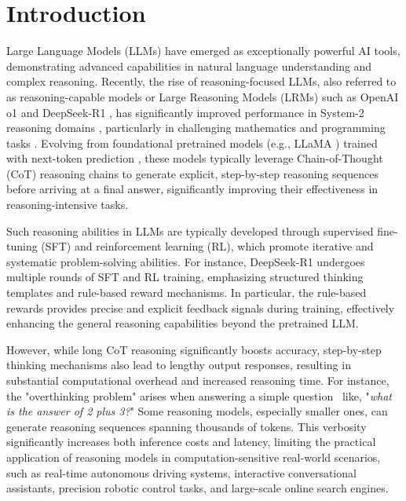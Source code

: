 \section{Introduction}

Large Language Models (LLMs) have emerged as exceptionally powerful AI tools, demonstrating advanced capabilities in natural language understanding and complex reasoning. Recently, the rise of reasoning-focused LLMs, also referred to as reasoning-capable models or Large Reasoning Models (LRMs) \cite{xu2025towards} such as OpenAI o1 \cite{openai_learning_to_reason} and DeepSeek-R1 \cite{guo2025deepseek}, has significantly improved performance in System-2 reasoning domains \cite{li2025system}, particularly in challenging mathematics \cite{cobbe2021training,hendrycks2measuring} and programming tasks \cite{codeforces, chen2021evaluating}. Evolving from foundational pretrained models (e.g., LLaMA \cite{touvron2023llama,grattafiori2024llama}) trained with next-token prediction \cite{devlin2019bert}, these models typically leverage Chain-of-Thought (CoT) \cite{wei2022chain} reasoning chains to generate explicit, step-by-step reasoning sequences before arriving at a final answer, significantly improving their effectiveness in reasoning-intensive tasks.

Such reasoning abilities in LLMs are typically developed through supervised fine-tuning (SFT) and reinforcement learning (RL), which promote iterative and systematic problem-solving abilities. For instance, DeepSeek-R1 \cite{guo2025deepseek} undergoes multiple rounds of SFT and RL training, emphasizing structured thinking templates and rule-based reward mechanisms. In particular, the rule-based rewards provides precise and explicit feedback signals during training, effectively enhancing the general reasoning capabilities beyond the pretrained LLM.

However, while long CoT reasoning significantly boosts accuracy, step-by-step thinking mechanisms also lead to lengthy output responses, resulting in substantial computational overhead and increased reasoning time. For instance, the "overthinking problem" arises when answering a simple question~\cite{chen2024not} like, "\textit{what is the answer of 2 plus 3?}" Some reasoning models, especially smaller ones, can generate reasoning sequences spanning thousands of tokens. This verbosity significantly increases both inference costs and latency, limiting the practical application of reasoning models in computation-sensitive real-world scenarios, such as real-time autonomous driving systems, interactive conversational assistants, precision robotic control tasks, and large-scale online search engines.

